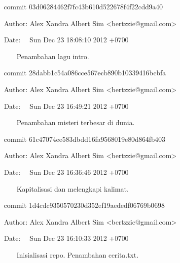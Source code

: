 {\fontsize{10pt}{10pt}\selectfont commit 03d06284462f7fc43b610d522678f4f22cdd9a40} \par
{\fontsize{10pt}{10pt}\selectfont Author: Alex Xandra Albert Sim <bertzzie@gmail.com>} \par
{\fontsize{10pt}{10pt}\selectfont Date:~~ Sun Dec 23 18:08:10 2012 +0700} \par
\vspace{10pt}
{\fontsize{10pt}{10pt}\selectfont ~~~ Penambahan lagu intro.} \par
\vspace{10pt}
{\fontsize{10pt}{10pt}\selectfont commit 28dabb1c54a086cce567ecb890b10339416bcbfa} \par
{\fontsize{10pt}{10pt}\selectfont Author: Alex Xandra Albert Sim <bertzzie@gmail.com>} \par
{\fontsize{10pt}{10pt}\selectfont Date:~~ Sun Dec 23 16:49:21 2012 +0700} \par
\vspace{10pt}
{\fontsize{10pt}{10pt}\selectfont ~~~ Penambahan misteri terbesar di dunia.} \par
\vspace{10pt}
{\fontsize{10pt}{10pt}\selectfont commit 61c47074ee583dbdd16fa9568019e80d864fb403} \par
{\fontsize{10pt}{10pt}\selectfont Author: Alex Xandra Albert Sim <bertzzie@gmail.com>} \par
{\fontsize{10pt}{10pt}\selectfont Date:~~ Sun Dec 23 16:36:46 2012 +0700} \par
\vspace{10pt}
{\fontsize{10pt}{10pt}\selectfont ~~~ Kapitalisasi dan melengkapi kalimat.} \par
\vspace{10pt}
{\fontsize{10pt}{10pt}\selectfont commit 1d4cdc9350570230d352ef19aededf06769b0698} \par
{\fontsize{10pt}{10pt}\selectfont Author: Alex Xandra Albert Sim <bertzzie@gmail.com>} \par
{\fontsize{10pt}{10pt}\selectfont Date:~~ Sun Dec 23 16:10:33 2012 +0700} \par
\vspace{10pt}
{\fontsize{10pt}{10pt}\selectfont ~~~ Inisialisasi repo. Penambahan cerita.txt.} \par
\vspace{12pt}
\vspace{12pt}
\noindent 
